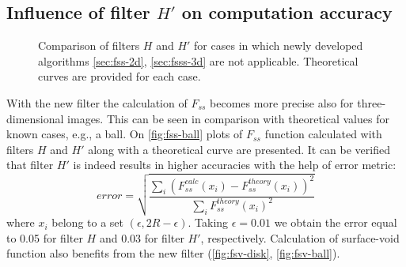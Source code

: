 \documentclass[preprint]{elsarticle}
\begin{document}
\subsection{Influence of filter $H'$ on computation accuracy}
\label{sec:influence}
\begin{figure}
  \centering
  \hfill
  \hfill
  \caption[]{Comparison of filters $H$ and $H'$ for cases in which newly
    developed algorithms \cref{sec:fss-2d}, \cref{sec:fsss-3d} are not
    applicable. Theoretical curves are provided for each case.}
  \label{fig:not-covered}
\end{figure}
With the new filter the calculation of $F_{ss}$ becomes more precise also for
three-dimensional images. This can be seen in comparison with theoretical values
for known cases, e.g., a ball. On \cref{fig:fss-ball} plots
of $F_{ss}$ function calculated with filters $H$ and $H'$ along with a
theoretical curve are presented. It can be verified that filter $H'$ is indeed results 
in higher accuracies with the help of error metric:
\begin{equation}
  error = \sqrt{\frac{\sum_i (F_{ss}^{calc}(x_i) -
      F_{ss}^{theory}(x_i))^2}{\sum_i F_{ss}^{theory}(x_i)^2}}
  \label{eq:error}
\end{equation}
where $x_i$ belong to a set $(\epsilon, 2R - \epsilon)$. Taking
$\epsilon = 0.01$ we obtain the error equal to 0.05 for filter $H$ and 0.03 for
filter $H'$, respectively. Calculation of surface-void function also benefits
from the new filter (\cref{fig:fsv-disk}, \cref{fig:fsv-ball}).
\end{document}
